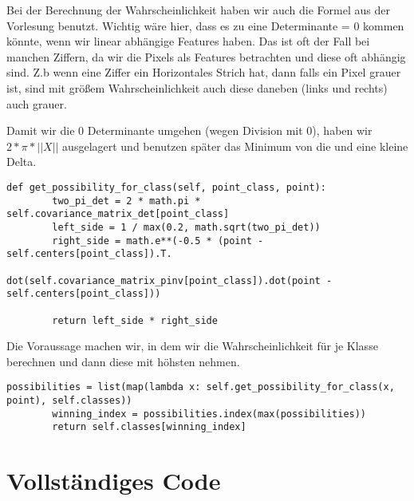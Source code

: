 Bei der Berechnung der Wahrscheinlichkeit haben wir auch die Formel aus der Vorlesung benutzt. Wichtig wäre hier, dass es zu eine Determinante = 0 kommen könnte,
wenn wir linear abhängige Features haben. Das ist oft der Fall bei manchen Ziffern, da wir die Pixels als Features betrachten und diese oft abhängig sind. Z.b wenn eine Ziffer ein Horizontales Strich hat, dann falls ein Pixel grauer ist, sind mit größem Wahrscheinlichkeit auch diese daneben (links und rechts) auch grauer.

Damit wir die 0 Determinante umgehen (wegen Division mit 0), haben wir $2 * \pi * ||X||$ ausgelagert und benutzen später das Minimum von die und eine kleine Delta.
\begin{lstlisting}[style=py]
def get_possibility_for_class(self, point_class, point):
        two_pi_det = 2 * math.pi * self.covariance_matrix_det[point_class]
        left_side = 1 / max(0.2, math.sqrt(two_pi_det))
        right_side = math.e**(-0.5 * (point - self.centers[point_class]).T.
                              dot(self.covariance_matrix_pinv[point_class]).dot(point - self.centers[point_class]))

        return left_side * right_side
\end{lstlisting}

Die Voraussage machen wir, in dem wir die Wahrscheinlichkeit für je Klasse berechnen und dann diese mit höhsten nehmen.
\begin{lstlisting}[style=py]
possibilities = list(map(lambda x: self.get_possibility_for_class(x, point), self.classes))
        winning_index = possibilities.index(max(possibilities))
        return self.classes[winning_index]
\end{lstlisting}

\section*{Vollständiges Code}

